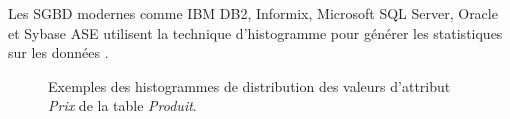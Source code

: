 Les SGBD modernes comme IBM DB2, Informix, Microsoft SQL Server, Oracle et Sybase ASE utilisent la technique d'histogramme pour générer les statistiques sur les données \cite{Ramakrishnan03}.

\begin{figure}
  \centering
  \quad
  \caption{Exemples des histogrammes de distribution des valeurs d'attribut \textit{Prix} de la table \textit{Produit}.}\label{fig:histo-types}
\end{figure}


